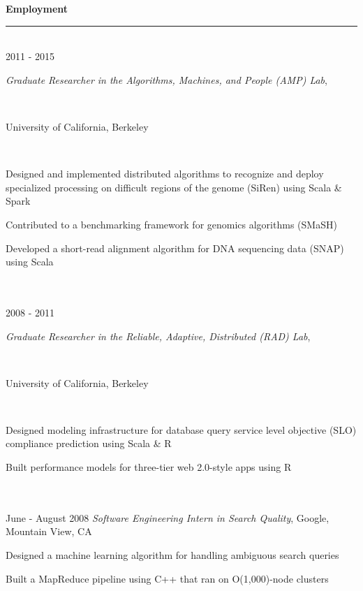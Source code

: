 \documentclass[11pt]{article}
\newcommand{\parwidth}{5.3 in}
\newcommand{\tabwidth}{1.5 in}
\newcommand{\head}[1]{
{\bf #1} \\
\rule{\textwidth}{0.01 in}

\vspace{-0.35 in}

}
\begin{document}

\head{Employment}

\begin{tabbing}
\hspace{\tabwidth} \= \\ 
2011 - 2015 \> \parbox[t]{\parwidth}{\textit{Graduate Researcher in the Algorithms, Machines, and People (AMP) Lab},}\\
\> \parbox[t]{\parwidth}{University of California, Berkeley}\\
\> \parbox[t]{\parwidth}{
\begin{compactitem}
\item Designed and implemented distributed algorithms to recognize and deploy specialized processing on difficult regions of the genome (SiRen) using Scala \& Spark
\item Contributed to a benchmarking framework for genomics algorithms (SMaSH)
\item Developed a short-read alignment algorithm for DNA sequencing data (SNAP) using Scala
\end{compactitem}
} \\

\hspace{\tabwidth} \= \\ 
2008 - 2011 \> \parbox[t]{\parwidth}{\textit{Graduate Researcher in the Reliable, Adaptive, Distributed (RAD) Lab},}\\
\> \parbox[t]{\parwidth}{University of California, Berkeley}\\
\> \parbox[t]{\parwidth}{
\begin{compactitem}
\item Designed modeling infrastructure for database query service level objective (SLO) compliance prediction using Scala \& R
\item Built performance models for three-tier web 2.0-style apps using R
\end{compactitem}
}\\

\hspace{\tabwidth} \= \\ 
June - August 2008 \> \emph{Software Engineering Intern in Search Quality}, Google, Mountain View, CA \\ 
\> \parbox[t]{\parwidth}{
\begin{compactitem}
\item Designed a machine learning algorithm for handling ambiguous search queries
\item Built a MapReduce pipeline using C++ that ran on O(1,000)-node clusters
\end{compactitem}
}\\


\end{tabbing}
\end{document}
